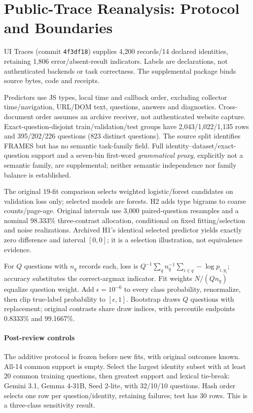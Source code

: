 \section{Public-Trace Reanalysis: Protocol and Boundaries}
\label{app:public-traces}
UI Traces (commit \texttt{4f3df18}) supplies 4,200 records/14 declared identities, retaining 1,806 error/absent-result indicators. Labels are declarations, not authenticated backends or task correctness. The supplemental package binds source bytes, code and receipts.

Predictors use JS types, local time and callback order, excluding collector time/navigation, URL/DOM text, questions, answers and diagnostics. Cross-document order assumes an archive receiver, not authenticated website capture. Exact-question-disjoint train/validation/test groups have 2,043/1,022/1,135 rows and 395/202/226 questions (823 distinct questions). The source split identifies FRAMES but has no semantic task-family field. Full identity--dataset/exact-question support and a seven-bin first-word \emph{grammatical proxy}, explicitly not a semantic family, are supplemental; neither semantic independence nor family balance is established.

The original 19-fit comparison selects weighted logistic/forest candidates on validation loss only; selected models are forests. H2 adds type bigrams to coarse counts/page-age. Original intervals use 3,000 paired-question resamples and a nominal 98.333\% three-contrast allocation, conditional on fixed fitting/selection and noise realizations. Archived H1's identical selected predictor yields exactly zero difference and interval $[0,0]$; it is a selection illustration, not equivalence evidence.

For $Q$ questions with $n_q$ records each, loss is $Q^{-1}\sum_q n_q^{-1}\sum_{i\in q}-\log p_{i,y_i}$; accuracy substitutes the correct-argmax indicator. Fit weights $N/(Qn_q)$ equalize question weight. Add $\epsilon=10^{-6}$ to every class probability, renormalize, then clip true-label probability to $[\epsilon,1]$. Bootstrap draws $Q$ questions with replacement; original contrasts share draw indices, with percentile endpoints 0.8333\% and 99.1667\%.

\paragraph{Post-review controls}
The additive protocol is frozen before new fits, with original outcomes known. All-14 common support is empty. Select the largest identity subset with at least 20 common training questions, then greatest support and lexical tie-break: Gemini 3.1, Gemma 4-31B, Seed 2-lite, with 32/10/10 questions. Hash order selects one row per question/identity, retaining failures; test has 30 rows. This is a three-class sensitivity result.

